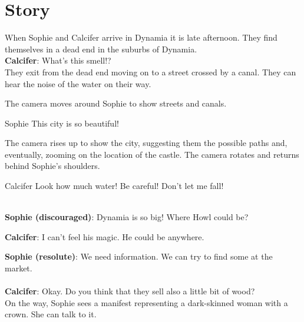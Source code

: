\section{Story}

When Sophie and Calcifer arrive in Dynamia it is late afternoon. They find themselves in a dead end in the suburbs of Dynamia.\\

\textbf{Calcifer}: What’s this smell!?\\

\noindent They exit from the dead end moving on to a street crossed by a canal. They can hear the noise of the water on their way.

\begin{screenplay}

The camera  moves around Sophie to show streets and canals. 

\begin{dialogue}[amazed]{Sophie}
This city is so beautiful!
\end{dialogue}

The camera rises up to show the city, suggesting them the possible paths and, eventually,  zooming on the location of the castle. The camera rotates and returns behind Sophie's shoulders. 

\begin{dialogue}[worried]{Calcifer}
Look how much water! Be careful! Don’t let me fall!
\end{dialogue}
\end{screenplay}

\noindent \\

\textbf{Sophie (discouraged)}: Dynamia is so big! Where Howl could be?

\textbf{Calcifer}: I can’t feel his magic. He could be anywhere.

\textbf{Sophie (resolute)}: We need information. We can try to find some at the market. \\

\\

\textbf{Calcifer}: Okay. Do you think that they sell also a little bit of wood?\\

\noindent On the way, Sophie sees a manifest representing a dark-skinned woman with a crown. She can talk to it.\\

